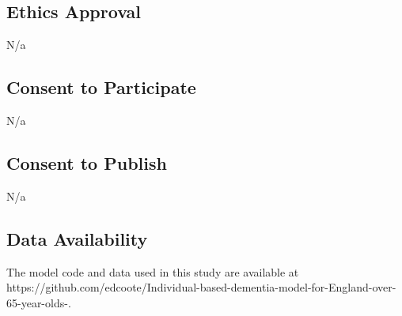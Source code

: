\documentclass[11pt,a4paper]{article}
\begin{document}
\subsection*{Ethics Approval}
N/a

\subsection*{Consent to Participate}
N/a

\subsection*{Consent to Publish}
N/a

\subsection*{Data Availability}
The model code and data used in this study are available at https://github.com/edcoote/Individual-based-dementia-model-for-England-over-65-year-olds-.
\end{document}
